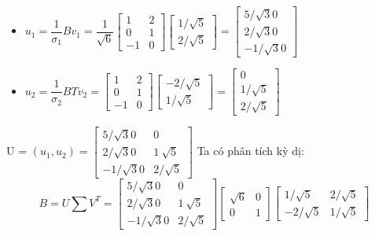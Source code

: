 \documentclass{article}
\begin{document}
\begin{itemize} 
    \item \(
        u_1 = \dfrac{1}{ \sigma_1} Bv_1 = \dfrac{1}{ \sqrt6} 
        \begin{bmatrix}
            1 & 2 \\ 0 & 1 \\ -1 & 0
        \end{bmatrix}
        \begin{bmatrix}
            1/ \sqrt5 \\ 2 / \sqrt5
        \end{bmatrix}
        = \begin{bmatrix}
            5/ \sqrt30 \\ 2/ \sqrt30 \\ -1/ \sqrt30
        \end{bmatrix}
    \)
    \item \(
        u_2 = \dfrac{1}{ \sigma_2} BTv_2 =
        \begin{bmatrix}
            1 & 2 \\ 0 & 1 \\ -1 & 0
        \end{bmatrix}
        \begin{bmatrix}
            -2/ \sqrt5 \\ 1 / \sqrt5
        \end{bmatrix}
        = \begin{bmatrix}
            0 \\ 1/ \sqrt5 \\ 2/ \sqrt5
        \end{bmatrix}
    \)
\end{itemize}
U = \( (u_1, u_2)  = 
\begin{bmatrix}
    5/ \sqrt30 & 0 \\ 2/ \sqrt30 & 1 \ \sqrt5 \\ -1/ \sqrt30 & 2/ \sqrt5
\end{bmatrix} \)
\newline Ta có phân tích kỳ dị:
\[ 
    B = U \sum V^T =
    \begin{bmatrix}
        5/ \sqrt30 & 0 \\ 2/ \sqrt30 & 1 \ \sqrt5 \\ -1/ \sqrt30 & 2/ \sqrt5
    \end{bmatrix} 
    \begin{bmatrix}
        \sqrt6 & 0 \\ 0 & 1
    \end{bmatrix}    
    \begin{bmatrix}
        1/ \sqrt5 & 2/ \sqrt5 \\ -2 / \sqrt5 & 1 / \sqrt5
    \end{bmatrix} 
\]
\end{document}

